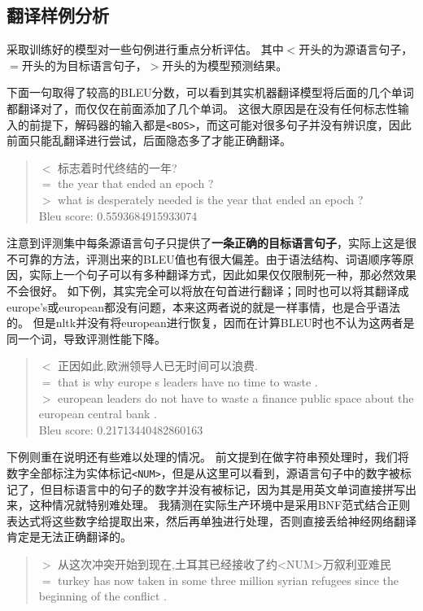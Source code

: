 \documentclass[logo,reportComp]{thesis}
\let\emph\relax %
\begin{document}
\subsection{翻译样例分析}
采取训练好的模型对一些句例进行重点分析评估。
其中$<$开头的为源语言句子，$=$开头的为目标语言句子，$>$开头的为模型预测结果。

下面一句取得了较高的BLEU分数，可以看到其实机器翻译模型将后面的几个单词都翻译对了，而仅仅在前面添加了几个单词。
这很大原因是在没有任何标志性输入的前提下，解码器的输入都是\verb'<BOS>'，而这可能对很多句子并没有辨识度，因此前面只能乱翻译进行尝试，后面隐态多了才能正确翻译。
\begin{quote}
$<$ 标志着时代终结的一年?\\
$=$ the year that ended an epoch ?\\
$>$ what is desperately needed is the year that ended an epoch ?\\
Bleu score: 0.5593684915933074
\end{quote}

注意到评测集中每条源语言句子只提供了\textbf{一条正确的目标语言句子}，实际上这是很不可靠的方法，评测出来的BLEU值也有很大偏差。由于语法结构、词语顺序等原因，实际上一个句子可以有多种翻译方式，因此如果仅仅限制死一种，那必然效果不会很好。
如下例，其实完全可以将\emph{欧洲领导人}放在句首进行翻译；同时也可以将其翻译成europe's或european都没有问题，本来这两者说的就是一样事情，也是合乎语法的。
但是nltk并没有将european进行恢复，因而在计算BLEU时也不认为这两者是同一个词，导致评测性能下降。
\begin{quote}
$<$ 正因如此,欧洲领导人已无时间可以浪费.\\
$=$ that is why europe s leaders have no time to waste .\\
$>$ european leaders do not have to waste a finance public space about the european central bank .\\
Bleu score: 0.21713440482860163
\end{quote}

下例则重在说明还有些难以处理的情况。
前文提到在做字符串预处理时，我们将数字全部标注为实体标记\verb'<NUM>'，但是从这里可以看到，源语言句子中的数字被标记了，但目标语言中的句子的数字并没有被标记，因为其是用英文单词直接拼写出来，这种情况就特别难处理。
我猜测在实际生产环境中是采用BNF范式结合正则表达式将这些数字给提取出来，然后再单独进行处理，否则直接丢给神经网络翻译肯定是无法正确翻译的。
\begin{quote}
$>$ 从这次冲突开始到现在,土耳其已经接收了约<NUM>万叙利亚难民\\
$=$ turkey has now taken in some three million syrian refugees since the beginning of the conflict .
\end{quote}
\end{document}
